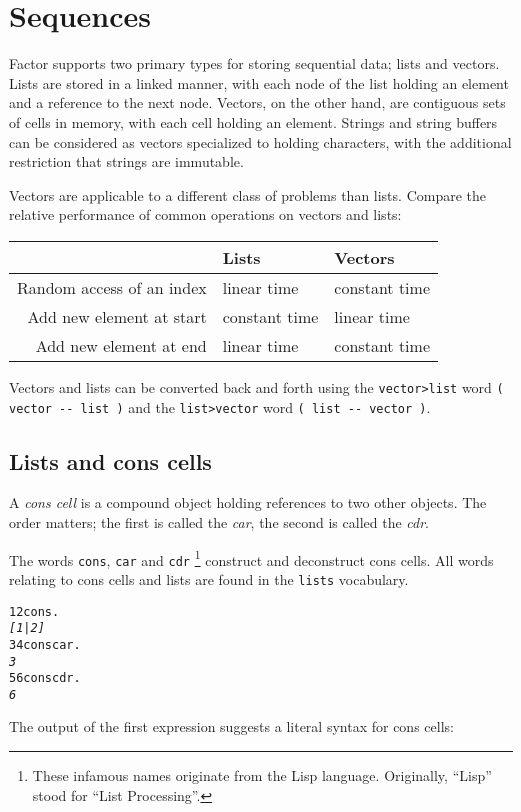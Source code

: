 \documentclass[english]{article}
\providecommand{\tabularnewline}{\\}
\begin{document}
\section{Sequences}

Factor supports two primary types for storing sequential data; lists and vectors.
Lists are stored in a linked manner, with each node of the list holding an
element and a reference to the next node. Vectors, on the other hand, are contiguous sets of cells in memory, with each cell holding an element. Strings and string buffers can be considered as vectors specialized to holding characters, with the additional restriction that strings are immutable.

Vectors are applicable to a different class of problems than lists.
Compare the relative performance of common operations on vectors and
lists:

\begin{tabular}{|r|l|l|}
\hline 
&
Lists&
Vectors\tabularnewline
\hline
\hline 
Random access of an index&
linear time&
constant time\tabularnewline
\hline 
Add new element at start&
constant time&
linear time\tabularnewline
\hline 
Add new element at end&
linear time&
constant time\tabularnewline
\hline
\end{tabular}

Vectors and lists can be converted back and forth using the \texttt{vector>list}
word \texttt{( vector -{}- list )} and the \texttt{list>vector} word
\texttt{( list -{}- vector )}.

\subsection{Lists and cons cells}

A \emph{cons cell} is a compound object holding references to two other objects. The order matters; the first is called the \emph{car},
the second is called the \emph{cdr}.

The words \texttt{cons}, \texttt{car} and \texttt{cdr}%
\footnote{These infamous names originate from the Lisp language. Originally,
{}``Lisp'' stood for {}``List Processing''.%
} construct and deconstruct cons cells.
All words relating to cons cells and lists are found in the \texttt{lists}
vocabulary.

\begin{alltt}
1 2 cons .
\emph{{[} 1 | 2 {]}}
3 4 cons car .
\emph{3}
5 6 cons cdr .
\emph{6}
\end{alltt}

The output of the first expression suggests a literal syntax for cons
cells:
\end{document}
